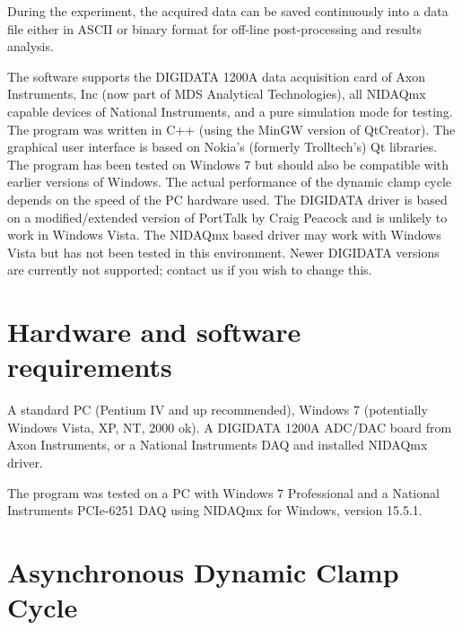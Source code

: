 \documentclass{article}
\begin{document}
During the experiment, the acquired data can be saved continuously into a
data file either in ASCII or binary format for off-line post-processing and
results analysis.
 
The software supports the DIGIDATA 1200A data acquisition card of Axon
Instruments, Inc (now part of MDS Analytical Technologies), all
NIDAQmx capable devices of National Instruments, and a pure simulation
mode for testing. The program was written in C++ (using the MinGW version of
QtCreator). The graphical user interface is based on Nokia's (formerly 
Trolltech's) Qt
libraries. The program has been tested on Windows 7 but should also
be compatible with earlier versions of Windows.
The actual performance of the dynamic clamp cycle depends
on the speed of the PC hardware used. The DIGIDATA driver is
based on a modified/extended version of PortTalk by Craig Peacock and
is unlikely to work in Windows Vista. The NIDAQmx based driver may
work with Windows Vista but has not been tested in this environment.
Newer DIGIDATA versions are currently not supported; contact us if you
wish to change this.

\section{Hardware and software requirements} 
 
A standard PC (Pentium IV and up recommended), Windows 7 (potentially
Windows Vista, XP, NT, 2000 ok). A DIGIDATA 1200A ADC/DAC board from Axon
Instruments, or a National Instruments DAQ and installed NIDAQmx
driver.

The program was tested on a PC with Windows 7 Professional and a
National Instruments PCIe-6251 DAQ using NIDAQmx for
Windows, version 15.5.1.

\section{Asynchronous Dynamic Clamp Cycle}
 
\end{document}
